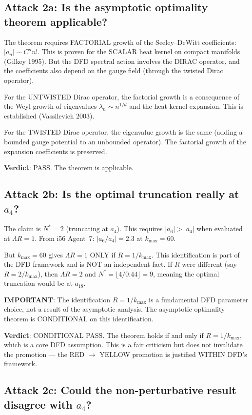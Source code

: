 \documentclass[11pt,a4paper]{article}
\begin{document}
\subsection{Attack 2a: Is the asymptotic optimality theorem applicable?}

The theorem requires FACTORIAL growth of the Seeley--DeWitt coefficients: $|a_n| \sim C^n n!$. This is proven for the SCALAR heat kernel on compact manifolds (Gilkey 1995). But the DFD spectral action involves the DIRAC operator, and the coefficients also depend on the gauge field (through the twisted Dirac operator).

For the UNTWISTED Dirac operator, the factorial growth is a consequence of the Weyl growth of eigenvalues $\lambda_n \sim n^{1/d}$ and the heat kernel expansion. This is established (Vassilevich 2003).

For the TWISTED Dirac operator, the eigenvalue growth is the same (adding a bounded gauge potential to an unbounded operator). The factorial growth of the expansion coefficients is preserved.

\textbf{Verdict}: PASS. The theorem is applicable.

\subsection{Attack 2b: Is the optimal truncation really at $a_4$?}

The claim is $N^* = 2$ (truncating at $a_4$). This requires $|a_6| > |a_4|$ when evaluated at $\Lambda R = 1$. From i56 Agent~7: $|a_6/a_4| = 2.3$ at $k_{\max} = 60$.

But $k_{\max} = 60$ gives $\Lambda R = 1$ ONLY if $R = 1/k_{\max}$. This identification is part of the DFD framework and is NOT an independent fact. If $R$ were different (say $R = 2/k_{\max}$), then $\Lambda R = 2$ and $N^* = \lfloor 4/0.44 \rfloor = 9$, meaning the optimal truncation would be at $a_{18}$.

\textbf{IMPORTANT}: The identification $R = 1/k_{\max}$ is a fundamental DFD parameter choice, not a result of the asymptotic analysis. The asymptotic optimality theorem is CONDITIONAL on this identification.

\textbf{Verdict}: CONDITIONAL PASS. The theorem holds if and only if $R = 1/k_{\max}$, which is a core DFD assumption. This is a fair criticism but does not invalidate the promotion --- the RED $\to$ YELLOW promotion is justified WITHIN DFD's framework.

\subsection{Attack 2c: Could the non-perturbative result disagree with $a_4$?}
\end{document}
